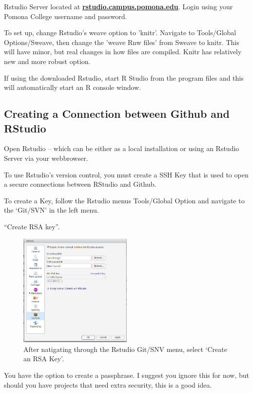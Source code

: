 \documentclass[12pt]{../SOP4_alpha}\usepackage[]{graphicx}\usepackage[]{color}
\begin{document}
\NP Rstudio Server located at \href{http://rstudio.campus.pomona.edu}{\textbf{rstudio.campus.pomona.edu}}. Login using your Pomona College username and password.

\NP To set up, change Rstudio's weave option to 'knitr'. Navigate to Tools/Global Options/Sweave, then change the 'weave Rnw files' from Sweave to knitr. This will have minor, but real changes in how files are compiled. Knitr has relatively new and more robust option.

\NP If using the downloaded Rstudio, start R Studio from the program files and this will automatically start an R console window.

\subsection{Creating a Connection between Github and RStudio}

\NP Open Rstudio -- which can be either as a local installation or using an Rstudio Server via your webbrowser.

\NP To use Rstudio's version control, you must create a SSH Key that is used to open a secure connections between RStudio and Github.

\NP To create a Key, follow the Rstudio menus Tools/Global Option and navigate to the `Git/SVN' in the left menu.

\NP ``Create RSA key''. 

\begin{figure}
\centering
\includegraphics[width=0.5\textwidth]{graphics/CreatingSSH.jpg}
\caption{After natigating through the Rstudio Git/SNV menu, select `Create an RSA Key'.}
\end{figure}

\NP You have the option to create a passphrase. I suggest you ignore this for now, but should you have projects that need extra security, this is a good idea.
\end{document}
